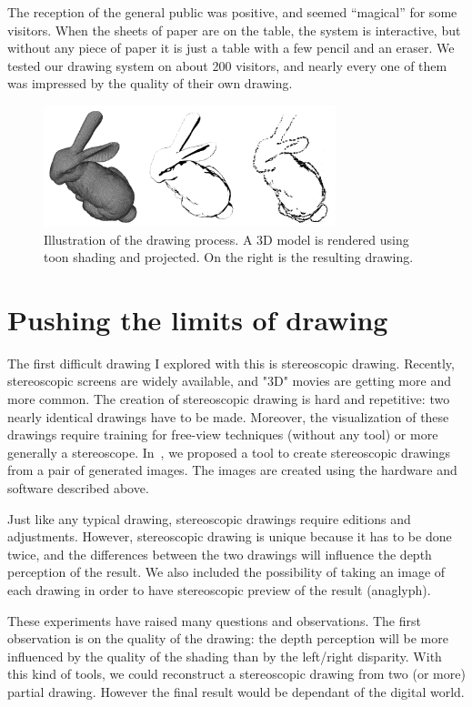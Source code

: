 \documentclass{article}
\begin{document}
 
The reception of the general public was positive, and seemed “magical” for some visitors. When the sheets of paper are on the table, the system is interactive, but without any piece of paper it is just a table with a few pencil and an eraser.
We tested our drawing system on about 200 visitors, and nearly every one of them was impressed by the quality of their own drawing. 


\begin{figure}[!h]
\centering
\includegraphics[width=85mm]{108079240.png}
\caption{Illustration of the drawing process. A 3D model is rendered using toon shading and projected. On the right is the resulting drawing.}
\label{fig:3lapins}
\end{figure}



\section{Pushing the limits of drawing}


The first difficult drawing I explored with this is stereoscopic drawing. 
Recently, stereoscopic screens are widely available, and "3D" movies are getting more and more common. The creation of stereoscopic drawing is hard and repetitive: two nearly identical drawings have to be made. Moreover, the visualization of these drawings require training for free-view techniques (without any tool) or more generally a stereoscope. In~\cite{laviole:hal-00671361}, we proposed a tool to create stereoscopic drawings from a pair of generated images. The images are created using the hardware and software described above. 

Just like any typical drawing, stereoscopic drawings require editions and adjustments. 
However, stereoscopic drawing is unique because it has to be done twice, and the differences between the two drawings will influence the depth perception of the result. We also included the possibility of taking an image of each drawing in order to have stereoscopic preview of the result (anaglyph). 

These experiments have raised many questions and observations. The first observation is on the quality of the drawing: the depth perception will be more influenced by the quality of the shading than by the left/right disparity. 
With this kind of tools, we could reconstruct a stereoscopic drawing from two (or more) partial drawing. However the final result would be dependant of the digital world. 
\end{document}

